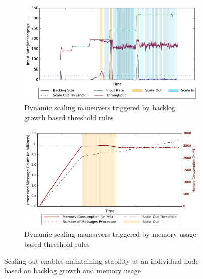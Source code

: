 \begin{figure}[h!]
    \begin{subfigure}{0.48\textwidth}
            \centering
            \includegraphics[scale=0.42]{figures/stability_partial.pdf}
            \caption{Dynamic scaling maneuvers triggered by backlog growth based threshold rules}
            \label{fig:stability-backlog}
    \end{subfigure}
    \begin{subfigure}{0.48\textwidth}
            \centering
            \includegraphics[scale=0.42]{figures//mem_stability.pdf} 
            \caption{Dynamic scaling maneuvers triggered by memory usage based threshold rules}
            \label{fig:stability-mem}
    \end{subfigure}
    \caption{Scaling out enables maintaining stability at an individual node based on backlog growth and memory usage}
    \label{fig:system-stability}
\end{figure}

%
